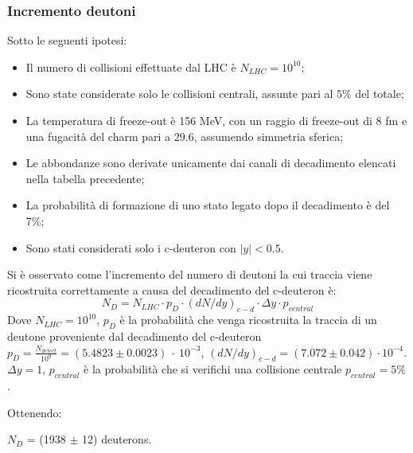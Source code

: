 \documentclass[11pt]{beamer}
\begin{document}
	\begin{frame}
		\frametitle{Incremento deutoni}
		Sotto le seguenti ipotesi: 
		\begin{itemize}
			\item Il numero di collisioni effettuate dal LHC è $N_{LHC} = 10^{10}$;
			\item Sono state considerate solo le collisioni centrali, assunte pari al $5\%$ del totale;
			\item La temperatura di freeze-out è 156 MeV, con un raggio di freeze-out di 8 fm e una fugacità del charm pari a 29.6, assumendo simmetria sferica;
			\item Le abbondanze sono derivate unicamente dai canali di decadimento elencati nella tabella precedente;
			\item La probabilità di formazione di uno stato legato dopo il decadimento è del 7\%;
			\item Sono stati considerati solo i c-deuteron con $|y|<0.5$.
		\end{itemize}
		
	\end{frame}
	
	\begin{frame}
		Si è osservato come l'incremento del numero di deutoni la cui traccia viene ricostruita correttamente a causa del decadimento del c-deuteron è:
		\begin{equation}
			N_D = N_{LHC} \cdot p_D \cdot (dN/dy)_{c-d} \cdot \Delta y \cdot p_{central}
		\end{equation}
		Dove $N_{LHC} = 10^{10}$, $p_D$ è la probabilità che venga ricostruita la traccia di un deutone proveniente dal decadimento del c-deuteron $p_D = \frac{N_{detect}}{10^9}= (5.4823 \pm 0.0023) \ \cdot \ 10^{-3}$, $(dN/dy)_{c-d}= (7.072 \pm 0.042) \cdot 10^{-4}$. $\Delta y = 1$, $p_{central}$ è la probabilità che si verifichi una collisione centrale $p_{central} = 5\%$. 
		
		Ottenendo:
		\begin{center}
			$N_D$ = (1938 $\pm$ 12) deuterons.
		\end{center}
	\end{frame}
	
\end{document}
